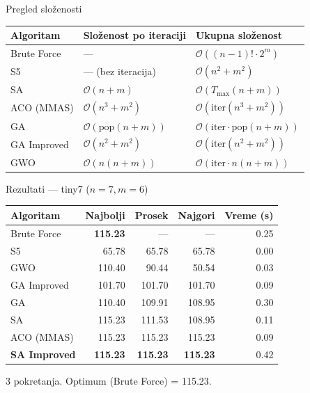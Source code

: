 \documentclass[aspectratio=169]{beamer}
\begin{document}
\begin{frame}{Pregled složenosti}
  \begin{center}
  \renewcommand{\arraystretch}{1.4}
  \begin{tabular}{lll}
    \toprule
    \textbf{Algoritam} & \textbf{Složenost po iteraciji} & \textbf{Ukupna složenost} \\
    \midrule
    Brute Force  & ---                            & $\mathcal{O}((n-1)!\cdot 2^m)$ \\
    S5           & --- (bez iteracija)            & $\mathcal{O}(n^2 + m^2)$ \\
    SA           & $\mathcal{O}(n + m)$           & $\mathcal{O}(T_{\max}(n+m))$ \\
    ACO (MMAS)   & $\mathcal{O}(n^3 + m^2)$      & $\mathcal{O}(\text{iter}(n^3+m^2))$ \\
    GA           & $\mathcal{O}(\text{pop}(n+m))$ & $\mathcal{O}(\text{iter}\cdot\text{pop}(n+m))$ \\
    GA Improved  & $\mathcal{O}(n^2 + m^2)$      & $\mathcal{O}(\text{iter}(n^2+m^2))$ \\
    GWO          & $\mathcal{O}(n(n+m))$         & $\mathcal{O}(\text{iter}\cdot n(n+m))$ \\
    \bottomrule
  \end{tabular}
  \end{center}
\end{frame}

\begin{frame}{Rezultati --- tiny7 ($n=7, m=6$)}
  \begin{center}
  \renewcommand{\arraystretch}{1.3}
  \begin{tabular}{lrrrr}
    \toprule
    \textbf{Algoritam} & \textbf{Najbolji} & \textbf{Prosek} & \textbf{Najgori} & \textbf{Vreme (s)} \\
    \midrule
    Brute Force          & \textbf{115.23} & ---    & ---    & 0.25 \\
    \midrule
    S5                   &  65.78 &  65.78 &  65.78 & 0.00 \\
    GWO                  & 110.40 &  90.44 &  50.54 & 0.03 \\
    GA Improved          & 101.70 & 101.70 & 101.70 & 0.09 \\
    GA                   & 110.40 & 109.91 & 108.95 & 0.30 \\
    SA                   & 115.23 & 111.53 & 108.95 & 0.11 \\
    ACO (MMAS)           & 115.23 & 115.23 & 115.23 & 0.09 \\
    \textbf{SA Improved} & \textbf{115.23} & \textbf{115.23} & \textbf{115.23} & 0.42 \\
    \bottomrule
  \end{tabular}
  \end{center}

  \smallskip
  {\footnotesize 3 pokretanja. Optimum (Brute Force) = 115.23.}
\end{frame}
\end{document}
